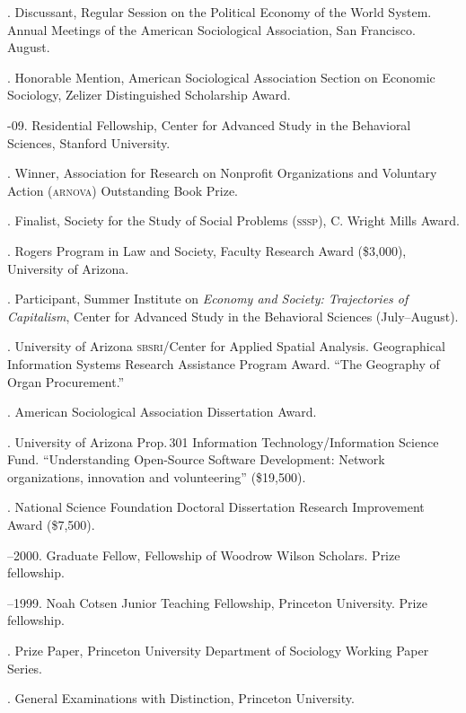 \documentclass[11pt]{article}
\begin{document}
. Discussant, Regular Session on the Political Economy of the World System. Annual Meetings of the American Sociological Association, San Francisco. August.


\bigskip

\medskip
  
. Honorable Mention, American Sociological Association Section on Economic Sociology, Zelizer Distinguished Scholarship Award.

-09. Residential Fellowship, Center for Advanced Study in the Behavioral Sciences, Stanford University.

. Winner, Association for Research on Nonprofit Organizations and Voluntary Action (\textsc{arnova}) Outstanding Book Prize.

. Finalist, Society for the Study of Social Problems (\textsc{sssp}), C. Wright Mills Award.

. Rogers Program in Law and Society, Faculty Research Award
(\$3,000), University of Arizona.

. Participant, Summer Institute on \emph{Economy and Society: Trajectories of Capitalism}, Center for Advanced Study in the Behavioral Sciences (July--August).

. University of Arizona \textsc{sbsri}/Center for Applied Spatial
Analysis. Geographical Information Systems Research Assistance
Program Award. ``The Geography of Organ Procurement.''

. American Sociological Association Dissertation Award.

. University of Arizona Prop.\,301 Information Technology/Information Science Fund. ``Understanding Open-Source Software Development: Network organizations, innovation and volunteering'' (\$19,500).

. National Science Foundation Doctoral Dissertation Research Improvement Award (\$7,500).

--2000. Graduate Fellow, Fellowship of Woodrow Wilson Scholars. Prize fellowship.

--1999. Noah Cotsen Junior Teaching Fellowship, Princeton University. Prize fellowship.

. Prize Paper, Princeton University Department of Sociology Working Paper Series.

. General Examinations with Distinction, Princeton University.
\end{document}
